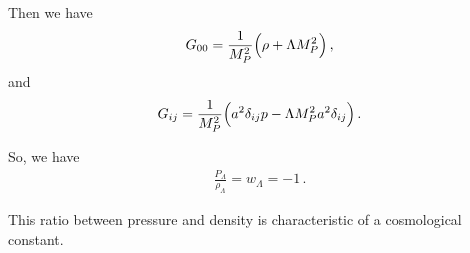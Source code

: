 \documentclass[main.tex]{subfiles}
\begin{document}
Then we have 
%
\begin{align}
  G_{00} = \frac{1}{M_P^2} \qty(\rho + \Lambda M_P^2)
\,,
\end{align}
%
and 
%
\begin{align}
  G_{ij} = \frac{1}{M_P^2} \qty(a^2 \delta_{ij} p - \Lambda M_P^2a^2 \delta_{ij})
\,.
\end{align}

So, we have 
%
\begin{align}
  \frac{P_{\Lambda }}{\rho_{\Lambda }} = w_{\Lambda } = -1
\,.
\end{align}

This ratio between pressure and density is characteristic of a cosmological constant. 
\end{document}
